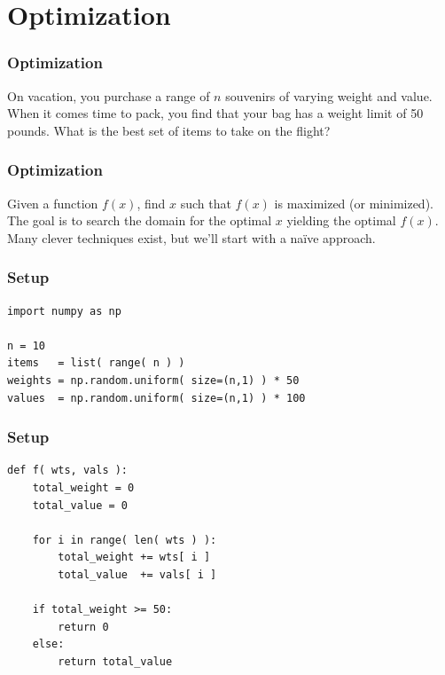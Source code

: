 \documentclass[11pt]{beamer}
\begin{document}
\section{Optimization}

\begin{frame}[fragile]
  \frametitle{Optimization}
  \Enlarge

  On vacation, you purchase a range of $n$ souvenirs of varying weight and value.  When it comes time to pack, you find that your bag has a weight limit of 50 pounds.  What is the best set of items to take on the flight?
\end{frame}

\begin{frame}[fragile]
  \frametitle{Optimization}
  \Enlarge

  \begin{enumerate}
  \myitem  Given a function $f(x)$, find $x$ such that $f(x)$ is maximized (or minimized).
  \myitem  The goal is to search the domain for the optimal $x$ yielding the optimal $f(x)$.
  \myitem  Many clever techniques exist, but we'll start with a na\"{i}ve approach.
  \end{enumerate}
\end{frame}

\begin{frame}[fragile]
  \frametitle{Setup}
  \Enlarge

  \begin{Verbatim}
import numpy as np

n = 10
items   = list( range( n ) )
weights = np.random.uniform( size=(n,1) ) * 50
values  = np.random.uniform( size=(n,1) ) * 100
  \end{Verbatim}
\end{frame}

\begin{frame}[fragile]
  \frametitle{Setup}

  \begin{Verbatim}
def f( wts, vals ):
    total_weight = 0
    total_value = 0

    for i in range( len( wts ) ):
        total_weight += wts[ i ]
        total_value  += vals[ i ]

    if total_weight >= 50:
        return 0
    else:
        return total_value
  \end{Verbatim}
\end{frame}
\end{document}
